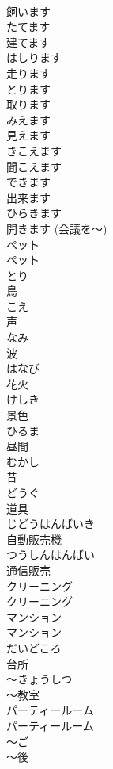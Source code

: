 \documentclass[8pt]{extreport}
\begin{document}
\begin{CJK}{UTF8}{min}
\\	飼います	
\\	たてます	
\\	建てます	
\\	はしります	
\\	走ります	
\\	とります	
\\	取ります		
\\	みえます	
\\	見えます	
\\	きこえます	
\\	聞こえます	
\\	できます	
\\	出来ます	
\\	ひらきます	
\\	開きます (会議を～) 
\\	ペット	
\\	ペット	
\\	とり	
\\	鳥	
\\	こえ	
\\	声	
\\	なみ	
\\	波		
\\	はなび	
\\	花火		
\\	けしき	
\\	景色	
\\	ひるま	
\\	昼間		
\\	むかし	
\\	昔		
\\	どうぐ	
\\	道具		
\\	じどうはんばいき	
\\	自動販売機	
\\	つうしんはんばい	
\\	通信販売		
\\	クリーニング	
\\	クリーニング		
\\	マンション	
\\	マンション	
\\	だいどころ	
\\	台所		
\\	〜きょうしつ	
\\	〜教室		
\\	パーティールーム	
\\	パーティールーム		
\\	〜ご	
\\	〜後		

\end{CJK}
\end{document}
